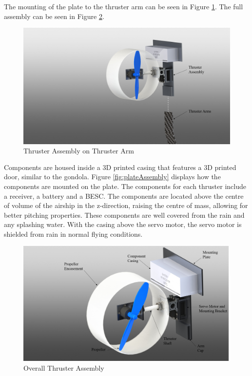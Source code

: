 \documentclass[../main.tex]{subfiles}
\begin{document}
The mounting of the plate to the thruster arm can be seen in Figure \ref{fig:thrusterOnKeel}. The full assembly can be seen in Figure \ref{fig:thrusterAssembly}.  

\begin{figure}[H]
	\centering
	\includegraphics[width=.8\linewidth]{img/design/thruster/thrusterOnKeel.png}
	\caption{Thruster Assembly on Thruster Arm}
	\label{fig:thrusterOnKeel}
\end{figure}

Components are housed inside a 3D printed casing that features a 3D printed door, similar to the gondola. Figure \ref{fig:plateAssembly} displays how the components are mounted on the plate. The components for each thruster include a receiver, a battery and a BESC. The components are located above the centre of volume of the airship in the z-direction, raising the centre of mass, allowing for better pitching properties. These components are well covered from the rain and any splashing water. With the casing above the servo motor, the servo motor is shielded from rain in normal flying conditions.

\begin{figure}[H]
	\centering
	\includegraphics[width=.8\linewidth]{img/design/thruster/thrusterAssembly.png}
	\caption{Overall Thruster Assembly}
	\label{fig:thrusterAssembly}
\end{figure}
\end{document}

